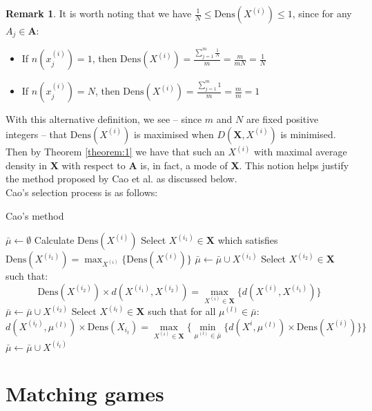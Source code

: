 \documentclass{article}
\theoremstyle{definition}
\newtheorem*{remark}{Remark}
\begin{document}
\begin{remark}
	It is worth noting that we have $ \frac{1}{N} \leq \text{Dens}(X^{(i)})
	\leq 1$, since for any $A_j \in \textbf{A}$:		
	\begin{itemize}	
		\item If $n(x_j^{(i)}) = 1$, then $\text{Dens}(X^{(i)}) = 
			\frac{\sum_{j=1}^m \frac{1}{N}}{m} = \frac{m}{mN} = 
			\frac{1}{N}$
		\item If $n(x_j^{(i)}) = N$, then $\text{Dens}(X^{(i)}) = 
			\frac{\sum_{j=1}^m 1}{m} = \frac{m}{m} = 1$
	\end{itemize}
\end{remark}

With this alternative definition, we see -- since $m$ and $N$ are fixed positive
integers -- that $\text{Dens}(X^{(i)})$ is maximised when $D(\textbf{X}, 
X^{(i)})$ is minimised. Then by Theorem \ref{theorem:1} we have that such an 
$X^{(i)}$ with maximal average density in \textbf{X} with respect to \textbf{A}
is, in fact, a mode of \textbf{X}. This notion helps justify the method proposed
by Cao et al. as discussed below.\\

Cao's selection process is as follows:

\begin{algorithm}[H]
\caption{Cao's method}\label{alg:cao}
	\begin{algorithmic}[0]
		\State $\bar{\mu} \gets \emptyset$
			\State Calculate $\text{Dens}(X^{(i)})$
		\EndFor
		\State Select $X^{(i_1)} \in \textbf{X}$ which satisfies 
			$\text{Dens}(X^{(i_1)}) = \max_{X^{(i)}} \{\text{Dens}(X^{(i)})\}$
		\State $\bar{\mu} \gets \bar{\mu} \cup X^{(i_1)}$
		\State Select $X^{(i_2)} \in \textbf{X}$ such that: 
		\[
			\text{Dens}(X^{(i_2)}) \times d(X^{(i_1)}, X^{(i_2)}) =
			\max_{X^{(i)} \in \textbf{X}} \{d(X^{(i)}, X^{(i_1)})\}
		\]
		\State $\bar{\mu} \gets \bar{\mu} \cup X^{(i_2)}$
			\State Select $X^{(i_t)} \in \textbf{X}$ such that for all 
                $\mu^{(l)} \in \bar{\mu}$:
			\[
				d(X^{(i_t)}, \mu^{(l)}) \times 
				\text{Dens}(X_{i_t}) = \max_{X^{(i)} \in 
				\textbf{X}} \{ \min_{\mu^{(l)} \in \bar{\mu}} 
				\{d(X^{i}, \mu^{(l)}) \times \text{Dens}(X^{(i)}) \} \}
			\]
			\State $\bar{\mu} \gets \bar{\mu} \cup X^{(i_t)}$
		\EndWhile
	\end{algorithmic}
\end{algorithm}

\section{Matching games}\label{section:matching}
\end{document}
